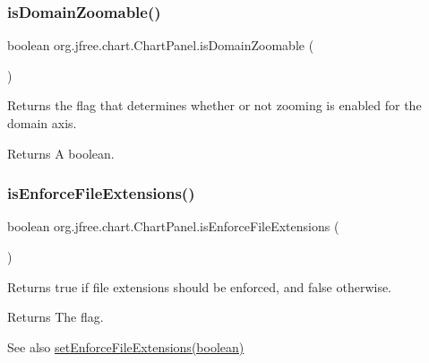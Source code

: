 \subsubsection{\texorpdfstring{is\+Domain\+Zoomable()}{isDomainZoomable()}}
{\footnotesize\ttfamily boolean org.\+jfree.\+chart.\+Chart\+Panel.\+is\+Domain\+Zoomable (\begin{DoxyParamCaption}{ }\end{DoxyParamCaption})}

Returns the flag that determines whether or not zooming is enabled for the domain axis.

\begin{DoxyReturn}{Returns}
A boolean. 
\end{DoxyReturn}
\mbox{\label{classorg_1_1jfree_1_1chart_1_1_chart_panel_aaebe30d98d0d14bcc5ef0f2015fd34d5}} 
\subsubsection{\texorpdfstring{is\+Enforce\+File\+Extensions()}{isEnforceFileExtensions()}}
{\footnotesize\ttfamily boolean org.\+jfree.\+chart.\+Chart\+Panel.\+is\+Enforce\+File\+Extensions (\begin{DoxyParamCaption}{ }\end{DoxyParamCaption})}

Returns {\ttfamily true} if file extensions should be enforced, and {\ttfamily false} otherwise.

\begin{DoxyReturn}{Returns}
The flag.
\end{DoxyReturn}
\begin{DoxySeeAlso}{See also}
\mbox{\hyperlink{classorg_1_1jfree_1_1chart_1_1_chart_panel_abb236dd517452e470fafc8b91923fde2}{set\+Enforce\+File\+Extensions(boolean)}} 
\end{DoxySeeAlso}
\mbox{\label{classorg_1_1jfree_1_1chart_1_1_chart_panel_a1a3a6c53775707054fd3f3c934804d32}} 
